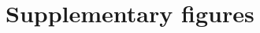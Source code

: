 \documentclass[sn-mathphys,Numbered]{sn-jnl}%
\begin{document}
\section{Supplementary figures} \label{sec:secSupplFigs}

\setcounter{figure}{0}
\renewcommand{\figurename}{Supplementary Fig.}
\renewcommand{\thefigure}{S\arabic{figure}}
\renewcommand{\theHfigure}{S\arabic{figure}}
\end{document}
